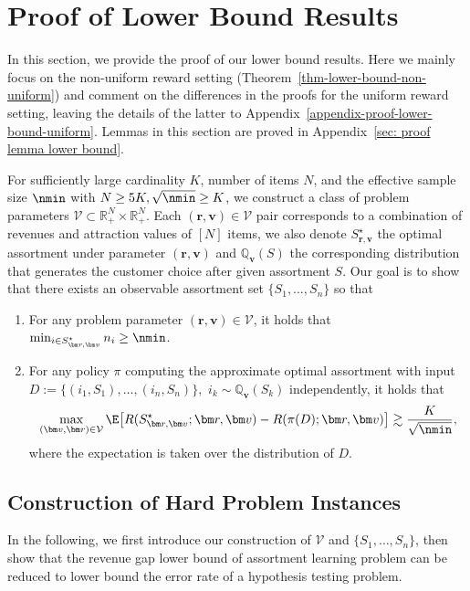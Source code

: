 \documentclass[10pt, letterpaper]{article}
\begin{document}
\section{Proof of Lower Bound Results}\label{sec-lower-bound-proof}


In this section, we provide the proof of our lower bound results. 
Here we mainly focus on the non-uniform reward setting (Theorem~\ref{thm-lower-bound-non-uniform}) and comment on the differences in the proofs for the uniform reward setting, leaving the details of the latter to Appendix~\ref{appendix-proof-lower-bound-uniform}.
Lemmas in this section are proved in Appendix~\ref{sec: proof lemma lower bound}.


For sufficiently large cardinality $K$, number of items $N$, and the effective sample size $\nmin$ with $N \geq 5K, \sqrt{\nmin}\geq K$, we construct a class of problem parameters $\mathcal{V} \subset \mathbb{R}_{+}^N \times \mathbb{R}^N_+$. Each $(\bm r,\bm{v}) \in \mathcal{V}$ pair corresponds to a combination of revenues and attraction values of $[N]$ items, we also denote $S^\star_{\bm r, \bm v}$ the optimal assortment under parameter $(\bm r, \bm v)$ and $\mathbb{Q}_{\bm v}(S)$ the corresponding distribution that generates the customer choice after given assortment $S$. Our goal is to show that there exists an observable assortment set $\{S_1,\dots,S_n\}$ so that 
\begin{enumerate}
    \item For any problem parameter $(\bm r, \bm v) \in \mathcal{V}$, it holds that $\min_{i\in S^\star_{\bm r, \bm v}}n_i \geq \nmin$.
    \item For any policy $\pi$ computing the approximate optimal assortment with input $D:=\{(i_1,S_1),\dots,(i_n,S_n)\},$ $i_k \sim \mathbb{Q}_{\bm v}(S_k)$ independently, it holds that \begin{align*}
    \max_{(\bm v, \bm r)\in \mathcal{V}}\E\big[ R(S^\star_{\bm r,\bm v};\bm r, \bm v) -   R(\pi(D);\bm r, \bm v) \big] \gtrsim \frac{K}{\sqrt{\nmin}},
\end{align*}
where the expectation is taken over the distribution of $D.$
\end{enumerate}

\subsection{Construction of Hard Problem Instances}\label{sec-construction}


In the following, we first introduce our construction of $\mathcal{V}$ and $\{S_1,\dots,S_n\}$, then show that the revenue gap lower bound of assortment learning problem can be reduced to lower bound the error rate of a hypothesis testing problem.
\end{document}
